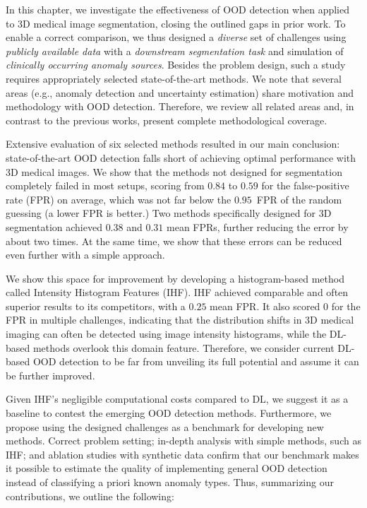 In this chapter, we investigate the effectiveness of OOD detection when applied to 3D medical image segmentation, closing the outlined gaps in prior work. To enable a correct comparison, we thus designed a \textit{diverse} set of challenges using \textit{publicly available data} with a \textit{downstream segmentation task} and simulation of \textit{clinically occurring anomaly sources}. Besides the problem design, such a study requires appropriately selected state-of-the-art methods. We note that several areas (e.g., anomaly detection and uncertainty estimation) share motivation and methodology with OOD detection. Therefore, we review all related areas and, in contrast to the previous works, present complete methodological coverage.

Extensive evaluation of six selected methods resulted in our main conclusion: state-of-the-art OOD detection falls short of achieving optimal performance with 3D medical images. We show that the methods not designed for segmentation completely failed in most setups, scoring from $0.84$ to $0.59$ for the false-positive rate (FPR) on average, which was not far below the $0.95$~FPR of the random guessing (a lower FPR is better.) Two methods specifically designed for 3D segmentation achieved $0.38$ and $0.31$ mean FPRs, further reducing the error by about two times. At the same time, we show that these errors can be reduced even further with a simple approach.

We show this space for improvement by developing a histogram-based method called Intensity Histogram Features (IHF). IHF achieved comparable and often superior results to its competitors, with a $0.25$ mean FPR. It also scored $0$ for the FPR in multiple challenges, indicating that the distribution shifts in 3D medical imaging can often be detected using image intensity histograms, while the DL-based methods overlook this domain feature. Therefore, we consider current DL-based OOD detection to be far from unveiling its full potential and assume it can be further improved.

Given IHF's negligible computational costs compared to DL, we suggest it as a baseline to contest the emerging OOD detection methods. Furthermore, we propose using the designed challenges as a benchmark for developing new methods. Correct problem setting; in-depth analysis with simple methods, such as IHF; and ablation studies with synthetic data confirm that our benchmark makes it possible to estimate the quality of implementing general OOD detection instead of classifying a priori known anomaly types. Thus, summarizing our contributions, we outline the following:

